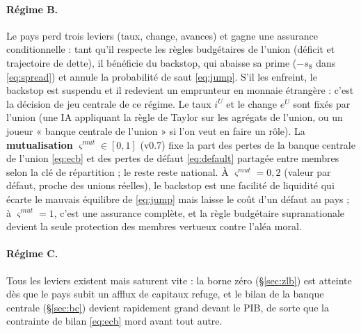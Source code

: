 \documentclass[11pt,a4paper]{article}
\newcommand{\og}{« }
\newcommand{\fg}{ »}
\begin{document}
\paragraph{Régime B.} Le pays perd trois leviers (taux, change, avances) et gagne une assurance conditionnelle : tant qu'il respecte les règles budgétaires de l'union (déficit et trajectoire de dette), il bénéficie du backstop, qui abaisse sa prime ($-s_8$ dans \eqref{eq:spread}) et annule la probabilité de saut \eqref{eq:jump}. S'il les enfreint, le backstop est suspendu et il redevient un emprunteur en monnaie étrangère : c'est la décision de jeu centrale de ce régime. Le taux $i^{U}$ et le change $e^U$ sont fixés par l'union (une IA appliquant la règle de Taylor sur les agrégats de l'union, ou un joueur \og banque centrale de l'union\fg{} si l'on veut en faire un rôle). La \textbf{mutualisation} $\varsigma^{mut}\in[0,1]$ (v0.7) fixe la part des pertes de la banque centrale de l'union \eqref{eq:ecb} et des pertes de défaut \eqref{eq:default} partagée entre membres selon la clé de répartition ; le reste reste national. À $\varsigma^{mut}=0{,}2$ (valeur par défaut, proche des unions réelles), le backstop est une facilité de liquidité qui écarte le mauvais équilibre de \eqref{eq:jump} mais laisse le coût d'un défaut au pays ; à $\varsigma^{mut}=1$, c'est une assurance complète, et la règle budgétaire supranationale devient la seule protection des membres vertueux contre l'aléa moral.

\paragraph{Régime C.} Tous les leviers existent mais saturent vite : la borne zéro (\S\ref{sec:zlb}) est atteinte dès que le pays subit un afflux de capitaux refuge, et le bilan de la banque centrale (\S\ref{sec:bc}) devient rapidement grand devant le PIB, de sorte que la contrainte de bilan \eqref{eq:ecb} mord avant tout autre.
\end{document}
